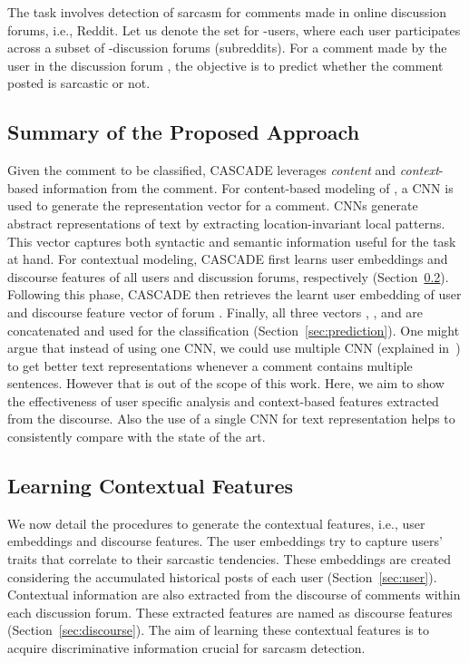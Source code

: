 \documentclass[11pt]{article}
\begin{document}
The task involves detection of sarcasm for comments made in online discussion forums, i.e., Reddit. Let us denote the set  for -users, where each user participates across a subset of -discussion forums (subreddits). For a comment  made by the  user  in the  discussion forum , the objective is to predict whether the comment posted is sarcastic or not. 

\subsection{Summary of the Proposed Approach} \label{sec:approach}

Given the comment  to be classified, CASCADE leverages \textit{content} and \textit{context}-based information from the comment. For content-based modeling of , a CNN is used to generate the representation vector  for a comment. CNNs generate abstract representations of text by extracting location-invariant local patterns. This vector  captures both syntactic and semantic information useful for the task at hand. For contextual modeling, CASCADE first learns user embeddings and discourse features of all users and discussion forums, respectively (Section~\ref{sec:context}).  Following this phase, CASCADE then retrieves the learnt user embedding  of user  and discourse feature vector  of forum . Finally, all three vectors , , and  are concatenated and used for the classification (Section~\ref{sec:prediction}). One might argue that instead of using one CNN, we could use multiple CNN (explained in~\cite{majumder2017deep}) to get better text representations whenever a comment contains multiple sentences. However that is out of the scope of this work. Here, we aim to show the effectiveness of user specific analysis and context-based features extracted from the discourse. Also the use of a single CNN for text representation helps to consistently compare with the state of the art.


\subsection{Learning Contextual Features} \label{sec:context}

We now detail the procedures to generate the contextual features, i.e., user embeddings and discourse features. The user embeddings try to capture users' traits that correlate to their sarcastic tendencies. These embeddings are created considering the accumulated historical posts of each user (Section~\ref{sec:user}). Contextual information are also extracted from the discourse of comments within each discussion forum. These extracted features are named as discourse features (Section~\ref{sec:discourse}). The aim of learning these contextual features is to acquire discriminative information crucial for sarcasm detection.
\end{document}
